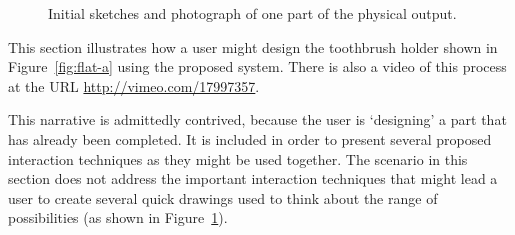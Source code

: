 \documentclass[12pt]{article}
\begin{document}
\begin{figure}[] 
\centering
{}
\hspace{5mm} 
\hspace{5mm} 
\caption{Initial sketches and photograph of one part of the physical
  output.}
\label{fig:physical-sketches}
\end{figure}

This section illustrates how a user might design the toothbrush holder
shown in Figure~\ref{fig:flat-a} using the proposed system. There is
also a video of this process at the URL
\href{http://vimeo.com/17997357}{http://vimeo.com/17997357}.

This narrative is admittedly contrived, because the user is
`designing' a part that has already been completed. It is included in
order to present several proposed interaction techniques as they might
be used together. The scenario in this section does not address the
important interaction techniques that might lead a user to create
several quick drawings used to think about the range of possibilities
(as shown in Figure~\ref{fig:physical-sketches}).
\end{document}
